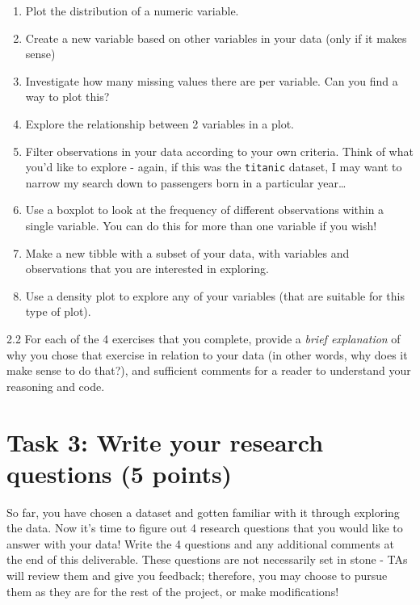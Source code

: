 \documentclass[
]{article}
\providecommand{\tightlist}{%
  \setlength{\itemsep}{0pt}\setlength{\parskip}{0pt}}
\begin{document}
\begin{enumerate}
\def\labelenumi{\arabic{enumi}.}
\tightlist
\item
  Plot the distribution of a numeric variable.
\item
  Create a new variable based on other variables in your data (only if
  it makes sense)
\item
  Investigate how many missing values there are per variable. Can you
  find a way to plot this?
\item
  Explore the relationship between 2 variables in a plot.
\item
  Filter observations in your data according to your own criteria. Think
  of what you'd like to explore - again, if this was the
  \texttt{titanic} dataset, I may want to narrow my search down to
  passengers born in a particular year\ldots{}
\item
  Use a boxplot to look at the frequency of different observations
  within a single variable. You can do this for more than one variable
  if you wish!
\item
  Make a new tibble with a subset of your data, with variables and
  observations that you are interested in exploring.
\item
  Use a density plot to explore any of your variables (that are suitable
  for this type of plot).
\end{enumerate}

2.2 For each of the 4 exercises that you complete, provide a \emph{brief
explanation} of why you chose that exercise in relation to your data (in
other words, why does it make sense to do that?), and sufficient
comments for a reader to understand your reasoning and code.

\hypertarget{task-3-write-your-research-questions-5-points}{%
\section{Task 3: Write your research questions (5
points)}\label{task-3-write-your-research-questions-5-points}}

So far, you have chosen a dataset and gotten familiar with it through
exploring the data. Now it's time to figure out 4 research questions
that you would like to answer with your data! Write the 4 questions and
any additional comments at the end of this deliverable. These questions
are not necessarily set in stone - TAs will review them and give you
feedback; therefore, you may choose to pursue them as they are for the
rest of the project, or make modifications!
\end{document}
